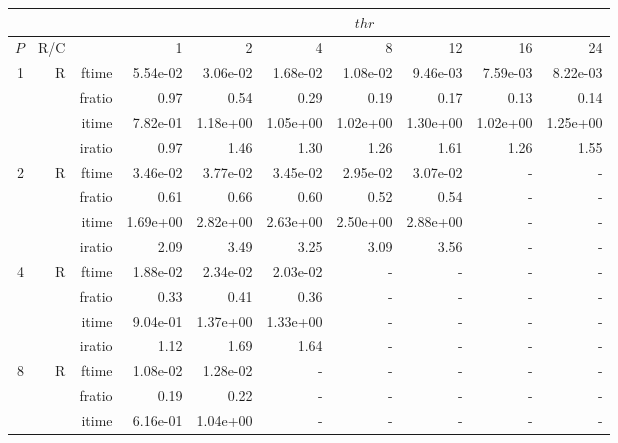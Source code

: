 \documentclass[a4paper]{article}
\begin{document}
\begin{table}[htbp]
\begin{center}
\begin{small}
\begin{tabular}{|r|r|r|r|r|r|r|r|r|r|}
\hline 
     & & & \multicolumn{7}{c|}{$thr$} \\ \hline
    $P$ & R/C &  & 1           & 2    & 4    & 8    & 12   & 16    & 24  \\ \hline\hline
     1 & R & ftime & 5.54e-02 & 3.06e-02 & 1.68e-02 & 1.08e-02 & 9.46e-03 & 7.59e-03 & 8.22e-03 \\   
          &      & fratio & 0.97 & 0.54 & 0.29 & 0.19 & 0.17 & 0.13 & 0.14 \\   
          &      & itime & 7.82e-01 & 1.18e+00 & 1.05e+00 & 1.02e+00 & 1.30e+00 & 1.02e+00 & 1.25e+00 \\   
          &      & iratio & 0.97 & 1.46 & 1.30 & 1.26 & 1.61 & 1.26 & 1.55 \\ \hline 
     2 & R & ftime & 3.46e-02 & 3.77e-02 & 3.45e-02 & 2.95e-02 & 3.07e-02 &     -     &     -     \\   
          &      & fratio & 0.61 & 0.66 & 0.60 & 0.52 & 0.54 &     -     &     -     \\   
          &      & itime & 1.69e+00 & 2.82e+00 & 2.63e+00 & 2.50e+00 & 2.88e+00 &     -     &     -     \\   
          &      & iratio & 2.09 & 3.49 & 3.25 & 3.09 & 3.56 &     -     &     -     \\ \hline 
     4 & R & ftime & 1.88e-02 & 2.34e-02 & 2.03e-02 &     -     &     -     &     -     &     -     \\   
          &      & fratio & 0.33 & 0.41 & 0.36 &     -     &     -     &     -     &     -     \\   
          &      & itime & 9.04e-01 & 1.37e+00 & 1.33e+00 &     -     &     -     &     -     &     -     \\   
          &      & iratio & 1.12 & 1.69 & 1.64 &     -     &     -     &     -     &     -     \\ \hline 
     8 & R & ftime & 1.08e-02 & 1.28e-02 &     -     &     -     &     -     &     -     &     -     \\   
          &      & fratio & 0.19 & 0.22 &     -     &     -     &     -     &     -     &     -     \\   
          &      & itime & 6.16e-01 & 1.04e+00 &     -     &     -     &     -     &     -     &     -     \\   

\end{tabular}
\end{small}
\end{center}
\end{table}
\end{document}

